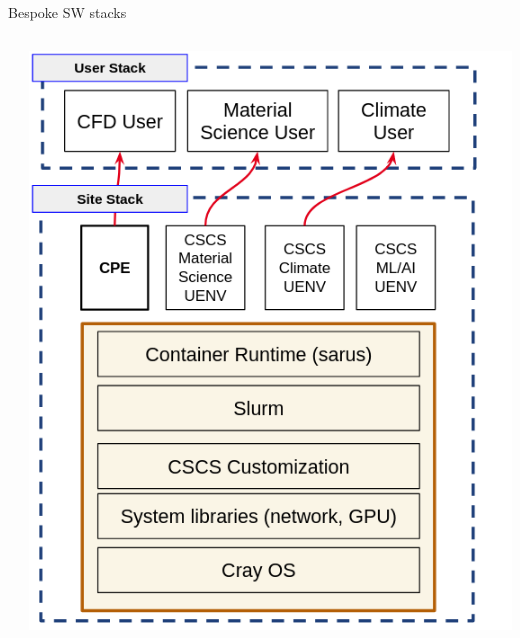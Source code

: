 \documentclass[aspectratio=43]{beamer}
\begin{document}
\begin{frame}[fragile]{Bespoke SW stacks}
\begin{columns}[T]
\begin{column}{0.6\textwidth}
        \end{column}
        \begin{column}{0.5\textwidth}
            \includegraphics[width=\textwidth]{images/stack-new.png}
        \end{column}
    \end{columns}
\end{frame}

\end{document}
